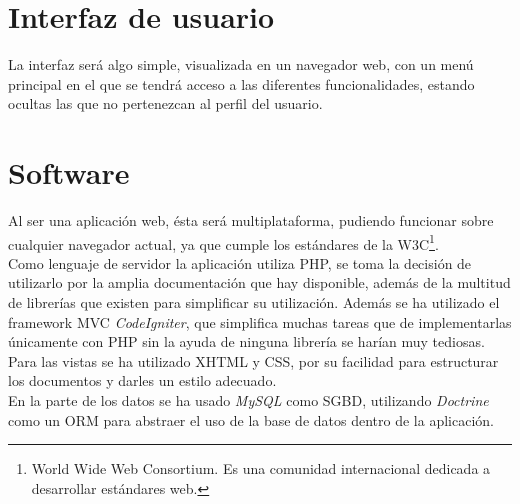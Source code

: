 \section{Interfaz de usuario}
La interfaz será algo simple, visualizada en un navegador web, con un menú principal en el que se tendrá acceso a las diferentes funcionalidades, estando ocultas las que no pertenezcan al perfil del usuario.

\section{Software}
Al ser una aplicación web, ésta será multiplataforma, pudiendo funcionar sobre cualquier navegador actual, ya que cumple los estándares de la W3C\footnote{World Wide Web Consortium. Es una comunidad internacional dedicada a desarrollar estándares web.}.\\

Como lenguaje de servidor la aplicación utiliza PHP, se toma la decisión de utilizarlo por la amplia documentación que hay disponible, además de la multitud de librerías que existen para simplificar su utilización. Además se ha utilizado el framework MVC {\em CodeIgniter}, que simplifica muchas tareas que de implementarlas únicamente con PHP sin la ayuda de ninguna librería se harían muy tediosas.\\

Para las vistas se ha utilizado XHTML y CSS, por su facilidad para estructurar los documentos y darles un estilo adecuado.\\

En la parte de los datos se ha usado {\em MySQL} como SGBD, utilizando {\em Doctrine} como un ORM para abstraer el uso de la base de datos dentro de la aplicación.
